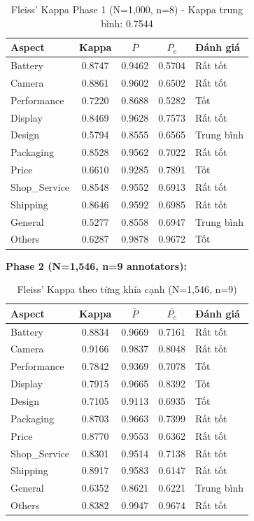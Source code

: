 \begin{table}[H]
\centering
\begin{tabular}{|l|c|c|c|l|}
\hline
\textbf{Aspect} & \textbf{Kappa} & \textbf{$\bar{P}$} & \textbf{$\bar{P_e}$} & \textbf{Đánh giá} \\
\hline
Battery & 0.8747 & 0.9462 & 0.5704 & Rất tốt \\
\hline
Camera & 0.8861 & 0.9602 & 0.6502 & Rất tốt \\
\hline
Performance & 0.7220 & 0.8688 & 0.5282 & Tốt \\
\hline
Display & 0.8469 & 0.9628 & 0.7573 & Rất tốt \\
\hline
Design & 0.5794 & 0.8555 & 0.6565 & Trung bình \\
\hline
Packaging & 0.8528 & 0.9562 & 0.7022 & Rất tốt \\
\hline
Price & 0.6610 & 0.9285 & 0.7891 & Tốt \\
\hline
Shop\_Service & 0.8548 & 0.9552 & 0.6913 & Rất tốt \\
\hline
Shipping & 0.8646 & 0.9592 & 0.6985 & Rất tốt \\
\hline
General & 0.5277 & 0.8558 & 0.6947 & Trung bình \\
\hline
Others & 0.6287 & 0.9878 & 0.9672 & Tốt \\
\hline
\end{tabular}
\caption{Fleiss' Kappa Phase 1 (N=1,000, n=8) - Kappa trung bình: 0.7544}
\label{tab:fleiss-kappa-phase1}
\end{table}

\textbf{Phase 2 (N=1,546, n=9 annotators):}

\begin{table}[H]
\centering
\begin{tabular}{|l|c|c|c|l|}
\hline
\textbf{Aspect} & \textbf{Kappa} & \textbf{$\bar{P}$} & \textbf{$\bar{P_e}$} & \textbf{Đánh giá} \\
\hline
Battery & 0.8834 & 0.9669 & 0.7161 & Rất tốt \\
\hline
Camera & 0.9166 & 0.9837 & 0.8048 & Rất tốt \\
\hline
Performance & 0.7842 & 0.9369 & 0.7078 & Tốt \\
\hline
Display & 0.7915 & 0.9665 & 0.8392 & Tốt \\
\hline
Design & 0.7105 & 0.9113 & 0.6935 & Tốt \\
\hline
Packaging & 0.8703 & 0.9663 & 0.7399 & Rất tốt \\
\hline
Price & 0.8770 & 0.9553 & 0.6362 & Rất tốt \\
\hline
Shop\_Service & 0.8301 & 0.9514 & 0.7138 & Rất tốt \\
\hline
Shipping & 0.8917 & 0.9583 & 0.6147 & Rất tốt \\
\hline
General & 0.6352 & 0.8621 & 0.6221 & Trung bình \\
\hline
Others & 0.8382 & 0.9947 & 0.9674 & Rất tốt \\
\hline
\end{tabular}
\caption{Fleiss' Kappa theo từng khía cạnh (N=1,546, n=9)}
\label{tab:fleiss-kappa-aspects}
\end{table}

